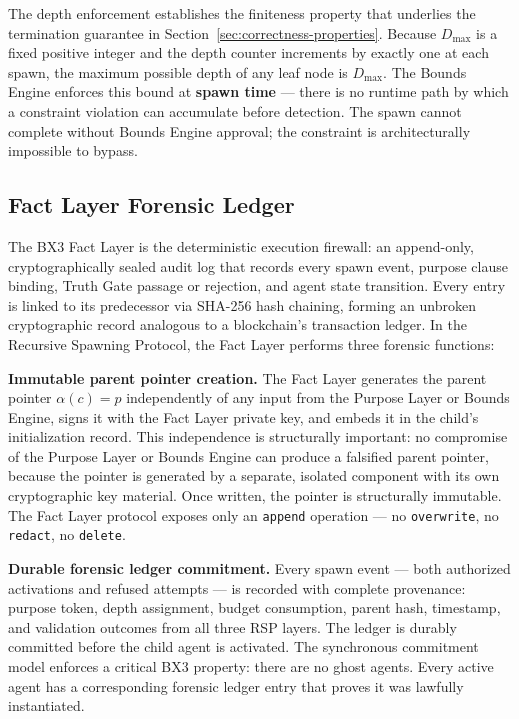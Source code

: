 The depth enforcement establishes the finiteness property that underlies the termination guarantee in Section~\ref{sec:correctness-properties}. Because $D_{\max}$ is a fixed positive integer and the depth counter increments by exactly one at each spawn, the maximum possible depth of any leaf node is $D_{\max}$. The Bounds Engine enforces this bound at \textbf{spawn time} — there is no runtime path by which a constraint violation can accumulate before detection. The spawn cannot complete without Bounds Engine approval; the constraint is architecturally impossible to bypass.

\subsection{Fact Layer Forensic Ledger}

The BX3 Fact Layer is the deterministic execution firewall: an append-only, cryptographically sealed audit log that records every spawn event, purpose clause binding, Truth Gate passage or rejection, and agent state transition. Every entry is linked to its predecessor via SHA-256 hash chaining, forming an unbroken cryptographic record analogous to a blockchain's transaction ledger. In the Recursive Spawning Protocol, the Fact Layer performs three forensic functions:

\textbf{Immutable parent pointer creation.} The Fact Layer generates the parent pointer $\alpha(c) = p$ independently of any input from the Purpose Layer or Bounds Engine, signs it with the Fact Layer private key, and embeds it in the child's initialization record. This independence is structurally important: no compromise of the Purpose Layer or Bounds Engine can produce a falsified parent pointer, because the pointer is generated by a separate, isolated component with its own cryptographic key material. Once written, the pointer is structurally immutable. The Fact Layer protocol exposes only an \texttt{append} operation — no \texttt{overwrite}, no \texttt{redact}, no \texttt{delete}.

\textbf{Durable forensic ledger commitment.} Every spawn event — both authorized activations and refused attempts — is recorded with complete provenance: purpose token, depth assignment, budget consumption, parent hash, timestamp, and validation outcomes from all three RSP layers. The ledger is durably committed before the child agent is activated. The synchronous commitment model enforces a critical BX3 property: there are no ghost agents. Every active agent has a corresponding forensic ledger entry that proves it was lawfully instantiated.


